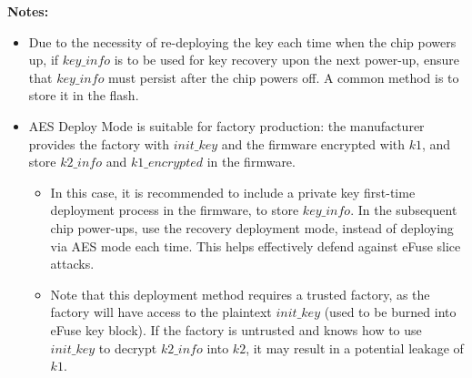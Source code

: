 \documentclass[main\_\_EN.tex]{subfiles}
\begin{document}
\textbf{Notes:}\\
\begin{itemize}
    \item Due to the necessity of re-deploying the key each time when the chip powers up, if \hyperref[para:keyinfo]{\begin{math}key\_info\end{math}} is to be used for key recovery upon the next power-up, ensure that \hyperref[para:keyinfo]{\begin{math}key\_info\end{math}} must persist after the chip powers off. A common method is to store it in the flash.
    \item AES Deploy Mode is suitable for factory production: the manufacturer provides the factory with \begin{math}init\_key\end{math} and the firmware encrypted with \begin{math}k1\end{math}, and store \begin{math}k2\_info\end{math} and \begin{math}k1\_encrypted\end{math} in the firmware.
    \begin{itemize}
        \item In this case, it is recommended to include a private key first-time deployment process in the firmware, to store \hyperref[para:keyinfo]{\begin{math}key\_info\end{math}}. In the subsequent chip power-ups, use the recovery deployment mode, instead of deploying via AES mode each time. This helps effectively defend against eFuse slice attacks.
        \item Note that this deployment method requires a trusted factory, as the factory will have access to the plaintext \begin{math}init\_key\end{math} (used to be burned into eFuse key block). If the factory is untrusted and knows how to use \begin{math}init\_key\end{math} to decrypt \begin{math}k2\_info\end{math} into \begin{math}k2\end{math}, it may result in a potential leakage of \begin{math}k1\end{math}.

\end{itemize}
\end{itemize}
\end{document}
